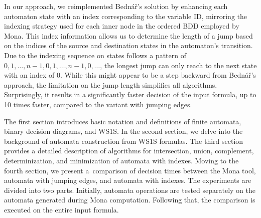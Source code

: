 \documentclass[pdflatex,sn-mathphys-num]{sn-jnl}%
\theoremstyle{thmstyleone}%
\theoremstyle{thmstyletwo}%
\theoremstyle{thmstylethree}%
\begin{document}
    In our approach, we reimplemented Bednář's solution by enhancing each automaton state with an index corresponding to the variable ID, mirroring the indexing strategy used for each inner node in the ordered BDD employed by Mona. This index information allows us to determine the length of a jump based on the indices of the source and destination states in the automaton's transition. Due to the indexing sequence on states follows a pattern of $0, 1, \dots, n-1, 0, 1, \dots, n-1, 0, \dots$, the longest jump can only reach to the next state with an index of $0$. While this might appear to be a step backward from Bednář's approach, the limitation on the jump length simplifies all algorithms. Surprisingly, it results in a significantly faster decision of the input formula, up to 10 times faster, compared to the variant with jumping edges.

    The first section introduces basic notation and definitions of finite automata, binary decision diagrams, and WS1S. In the second section, we delve into the background of automata construction from WS1S formulas. The third section provides a detailed description of algorithms for intersection, union, complement, determinization, and minimization of automata with indexes. Moving to the fourth section, we present a~comparison of decision times between the Mona tool, automata with jumping edges, and automata with indexes. The experiments are divided into two parts. Initially, automata operations are tested separately on the automata generated during Mona computation. Following that, the comparison is executed on the entire input formula.








\end{document}
